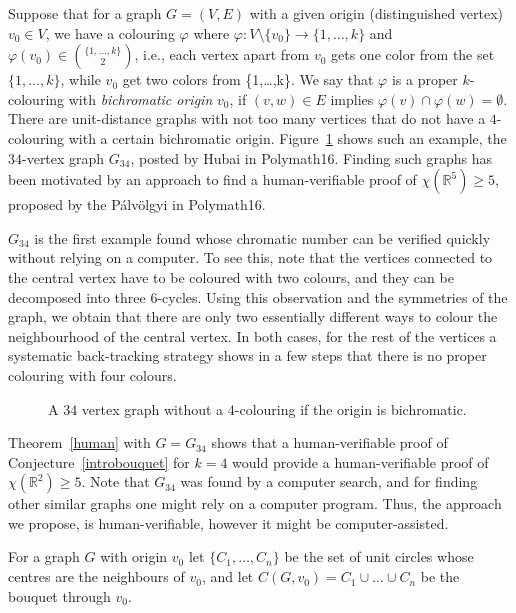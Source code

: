 \documentclass[12pt]{article}
\newcommand{\R}{{\mathbb R}}
\theoremstyle{plain}
\theoremstyle{definition}
\begin{document}
Suppose that for a graph $G=(V,E)$ with a given origin (distinguished vertex) $v_0\in V$, we have a colouring $\varphi$ where $\varphi:V\setminus\{v_0\} \to \{1,\dots,k\}$ and $\varphi(v_0)\in \binom{\{1,\dots,k\}}{2}$, i.e., each vertex apart from $v_0$ gets one color from the set $\{1,\dots,k\}$, while $v_0$ get two colors from \{1,\dots,k\}.
We say that $\varphi$ is a proper $k$-colouring with \emph{bichromatic origin} $v_0$, if $(v,w)\in E$ implies $\varphi(v)\cap \varphi(w)=\emptyset$. There are unit-distance graphs with not too many vertices that do not have a $4$-colouring with a certain bichromatic origin. Figure~\ref{abra4} shows such an example, the $34$-vertex graph $G_{34}$, posted by Hubai \cite{tamas} in Polymath16. Finding such graphs has been motivated by an approach to find a human-verifiable proof of $\chi(\mathbb{R}^5)\geq 5$, proposed by the Pálvölgyi \cite{domotor} in Polymath16.

$G_{34}$ is the first example  found whose chromatic number can be verified quickly without relying on a computer. To see this, note that the vertices connected to the central vertex have to be coloured with two colours, and they can be decomposed into three $6$-cycles. Using this observation and the symmetries of the graph, we obtain that there are only two essentially different ways to colour the neighbourhood of the central vertex. In both cases, for the rest of the vertices a systematic back-tracking strategy shows in a few steps that there is no proper colouring with four colours.


\begin{figure}[h]
\begin{center}

\end{center}
\caption{\small{A $34$ vertex graph without a $4$-colouring if the origin is bichromatic.}}\label{abra4}
\end{figure} 


Theorem~\ref{human} with $G=G_{34}$ shows that a human-verifiable proof of Conjecture~\ref{introbouquet} for $k=4$ would provide a human-verifiable proof of $\chi(\R^2)\geq 5$. Note that $G_{34}$ was found by a computer search, and for finding other similar graphs one might rely on a computer program. Thus, the approach we propose, is human-verifiable, however it might be computer-assisted.

For a graph $G$ with origin $v_0$ let $\{C_1,\dots,C_n\}$ be the set of unit circles whose centres are the neighbours of $v_0$, and let $C(G,v_0)=C_1\cup\dots\cup C_n$ be the bouquet through $v_0$.
\end{document}
